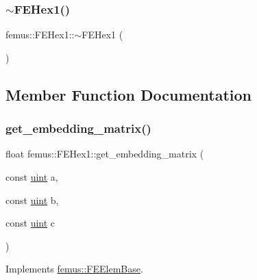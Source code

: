 \mbox{\label{classfemus_1_1_f_e_hex1_a63865a413c61c54242946b284e35cd8a}} 
\subsubsection{\texorpdfstring{$\sim$\+F\+E\+Hex1()}{~FEHex1()}}
{\footnotesize\ttfamily femus\+::\+F\+E\+Hex1\+::$\sim$\+F\+E\+Hex1 (\begin{DoxyParamCaption}{ }\end{DoxyParamCaption})}



\subsection{Member Function Documentation}
\mbox{\label{classfemus_1_1_f_e_hex1_aaa8731caede9d90c2fee78a7440f610a}} 
\subsubsection{\texorpdfstring{get\+\_\+embedding\+\_\+matrix()}{get\_embedding\_matrix()}}
{\footnotesize\ttfamily float femus\+::\+F\+E\+Hex1\+::get\+\_\+embedding\+\_\+matrix (\begin{DoxyParamCaption}\item[{const \mbox{\hyperlink{_typedefs_8hpp_a91ad9478d81a7aaf2593e8d9c3d06a14}{uint}}}]{a,  }\item[{const \mbox{\hyperlink{_typedefs_8hpp_a91ad9478d81a7aaf2593e8d9c3d06a14}{uint}}}]{b,  }\item[{const \mbox{\hyperlink{_typedefs_8hpp_a91ad9478d81a7aaf2593e8d9c3d06a14}{uint}}}]{c }\end{DoxyParamCaption})\hspace{0.3cm}{\ttfamily [virtual]}}



Implements \mbox{\hyperlink{classfemus_1_1_f_e_elem_base_a0c4d6d5ec66bd4e301eb8ea2ef10f354}{femus\+::\+F\+E\+Elem\+Base}}.

